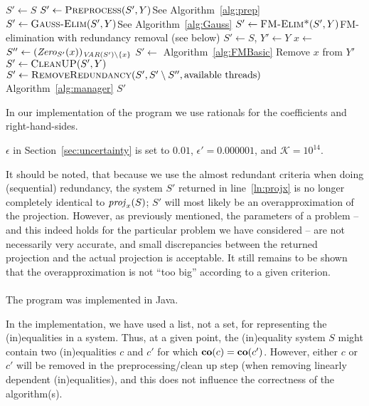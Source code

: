 \begin{algorithm}\caption{Overview of the method for projecting the variables $Y$ from an (in)equality system  $S$.}\label{alg:project}
\begin{algorithmic}[1]
	\State $S'\gets S$
	\State $S'\gets\Call{Preprocess}{S',Y}$\Comment See Algorithm~\ref{alg:prep}
	\State $S'\gets\Call{Gauss-Elim}{S',Y}$\Comment See Algorithm~\ref{alg:Gauss} 
	\State $S'\gets \Call{FM-Elim*}{S',Y}$\Comment FM-elimination with redundancy removal (see below)
\EndFunction
\State
{}
	\State  $S'\gets S$, $Y'\gets Y$
		\State $x\gets$ 
		\State $S''\gets(\mathit{Zero}_{S'}(x))_{\mathit{VAR}(S')\setminus\{x\}}$
		\State $S' \gets$  \Comment Algorithm~\ref{alg:FMBasic}
		\State Remove $x$ from $Y'$
		\State $S'\gets\Call{CleanUP}{S',Y}$
		\State $S'\gets \Call{RemoveRedundancy}{S', S'\setminus S'', \text{available threads}}$ 	\Comment Algorithm~\ref{alg:manager}\label{ln:projx}
	\EndWhile
	\State \Return $S'$
\EndFunction
\end{algorithmic}
\end{algorithm}

{In our implementation of the program we use rationals for the coefficients and right-hand-sides}.

$\epsilon$ in Section~\ref{sec:uncertainty} is set to $0.01$, $\epsilon' = 0.000001$, and $\mathcal{K} = 10^{14}$.

{It should be noted, that because we use the almost redundant criteria when doing (sequential) redundancy, the system $S'$ returned in line~\ref{ln:projx} is no longer completely identical to $\mathit{proj}_x(S)$; $S'$ will most likely be an overapproximation of the projection. However, as previously mentioned, the parameters of a problem -- and this indeed holds for the particular problem we have considered -- are not necessarily very accurate, and small discrepancies between the returned projection and the actual projection is acceptable. It still remains to be shown that the overapproximation is not ``too big'' according to a given criterion.}
\\
\\
The program was implemented in Java.

In the implementation, we have used a list, not a set, for representing the (in)equalities in a system. Thus, at a given point, the (in)equality system $S$ might contain two (in)equalities $c$ and $c'$ for which $\mathbf{co}(c)=\mathbf{co}(c')$. However, either $c$ or $c'$ will be removed in the preprocessing/clean up step (when removing linearly dependent (in)equalities), and this does not influence the correctness of the algorithm(s).


